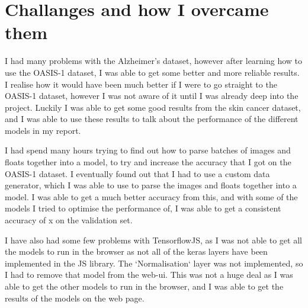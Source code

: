 \documentclass[]{final_report}
\begin{document}
\section{Challanges and how I overcame them}

I had many problems with the Alzheimer's dataset, however after learning how to use the OASIS-1 dataset, I was able to get some better and more reliable results. I realise how it would have been much better if I were to go straight to the OASIS-1 dataset, however I was not aware of it until I was already deep into the project. Luckily I was able to get some good results from the skin cancer dataset, and I was able to use these results to talk about the performance of the different models in my report.

I had spend many hours trying to find out how to parse batches of images and floats together into a model, to try and increase the accuracy that I got on the OASIS-1 dataset. I eventually found out that I had to use a custom data generator, which I was able to use to parse the images and floats together into a model. I was able to get a much better accuracy from this, and with some of the models I tried to optimise the performance of, I was able to get a consistent accuracy of x on the validation set.


I have also had some few problems with TensorflowJS\cite{tensorflowjs}, as I was not able to get all the models to run in the browser as not all of the keras layers have been implemented in the JS library. The `Normalisation` layer was not implemented, so I had to remove that model from the web-ui. This was not a huge deal as I was able to get the other models to run in the browser, and I was able to get the results of the models on the web page.

\newpage
\printbibliography
\label{endpage}
\end{document}
